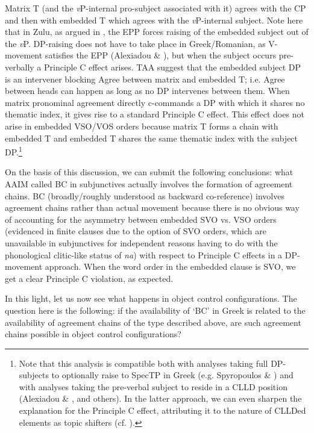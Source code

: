 \documentclass[output=paper]{langsci/langscibook}
\begin{document}
Matrix T (and the \textit{v}P-internal pro-subject associated with it) agrees with the CP and then with embedded T which agrees with the \textit{v}P-internal subject. Note here that in Zulu, as argued in \citet{Halpert2016}, the EPP forces raising of the embedded subject out of the \textit{v}P. DP-raising does not have to take place in Greek/Romanian, as V-movement satisfies the EPP (Alexiadou \& \citealt{Anagnostopoulou1998}), but when the subject occurs pre-verbally a Principle C effect arises. TAA suggest that the embedded subject DP is an intervener blocking Agree between matrix and embedded T; i.e. Agree between heads can happen as long as no DP intervenes between them. When matrix pronominal agreement directly c-commands a DP with which it shares no thematic index, it gives rise to a standard Principle C effect. This effect does not arise in embedded VSO/VOS orders because matrix T forms a chain with embedded T and embedded T shares the same thematic index with the subject DP.\footnote{Note that this analysis is compatible both with analyses taking full DP-subjects to optionally raise to SpecTP in Greek (e.g. Spyropoulos \& \citealt{Revithiadou2009}) and with analyses taking the pre-verbal subject to reside in a CLLD position (Alexiadou \& \citealt{Anagnostopoulou1998}, \citealt{Barbosa2009} and others). In the latter approach, we can even sharpen the explanation for the Principle C effect, attributing it to the nature of CLLDed elements as topic shifters (cf. \citealt{Frascarelli2007}).}   

On the basis of this discussion, we can submit the following conclusions: what AAIM called BC in subjunctives actually involves the formation of agreement chains. BC (broadly/roughly understood as backward co-reference) involves agreement chains rather than actual movement because there is no obvious way of accounting for the asymmetry between embedded SVO vs. VSO orders (evidenced in finite clauses due to the option of SVO orders, which are unavailable in subjunctives for independent reasons having to do with the phonological clitic-like status of \textit{na}) with respect to Principle C effects in a DP-movement approach. When the word order in the embedded clause is SVO, we get a clear Principle C violation, as expected.

In this light, let us now see what happens in object control configurations. The question here is the following: if the availability of ‘BC’ in Greek is related to the availability of agreement chains of the type described above, are such agreement chains possible in object control configurations?
\end{document}
